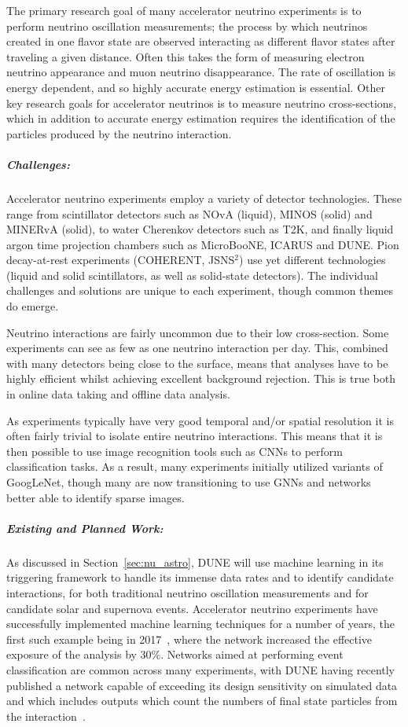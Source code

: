     The primary research goal of many accelerator neutrino experiments is to perform neutrino oscillation measurements; the process by which neutrinos created in one flavor state are observed interacting as different flavor states after traveling a given distance. Often this takes the form of measuring electron neutrino appearance and muon neutrino disappearance. The rate of oscillation is energy dependent, and so highly accurate energy estimation is essential. Other key research goals for accelerator neutrinos is to measure neutrino cross-sections, which in addition to accurate energy estimation requires the identification of the particles produced by the neutrino interaction. 
    
\subparagraph*{Challenges:} Accelerator neutrino experiments employ a variety of detector technologies. 
These range from scintillator detectors such as NOvA (liquid), MINOS (solid) and MINERvA (solid), to water 
Cherenkov detectors such as T2K, and finally liquid argon time projection chambers such as MicroBooNE, ICARUS and DUNE. 
Pion decay-at-rest experiments (COHERENT, JSNS$^2$) use yet different technologies (liquid and solid scintillators, as well as solid-state detectors). The individual challenges and solutions are unique to each experiment, though common themes do emerge.
    
    Neutrino interactions are fairly uncommon due to their low cross-section. 
    Some experiments can see as few as one neutrino interaction per day. This, combined with many detectors being close to the surface, means that analyses have to be highly efficient whilst achieving excellent background rejection. 
    This is true both in online data taking and offline data analysis.
    
    As experiments typically have very good temporal and/or spatial resolution it is often fairly trivial to isolate entire neutrino interactions. 
    This means that it is then possible to use image recognition tools such as CNNs to perform classification tasks. 
    As a result, many experiments initially utilized variants of GoogLeNet, though many are now transitioning to use GNNs and networks better able to identify sparse images. 

\subparagraph*{Existing and Planned Work:} As discussed in Section~\ref{sec:nu_astro}, DUNE will use machine learning in its triggering framework to handle its immense data rates and to identify candidate interactions, for both traditional neutrino oscillation measurements and for candidate solar and supernova events. 
Accelerator neutrino experiments have successfully implemented machine learning techniques for a number of years, the first such example being in 2017~\cite{Adamson_2017}, where the network increased the effective exposure of the analysis by 30\%. Networks aimed at performing event classification are common across many experiments, with DUNE having recently published a network capable of exceeding its design sensitivity on simulated data and which includes outputs which count the numbers of final state particles from the interaction~\cite{Abi_2020}.
    
